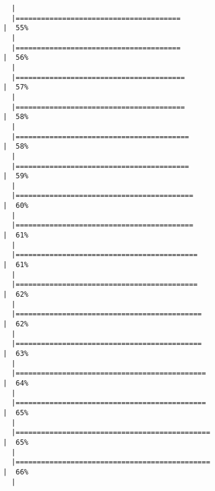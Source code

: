 \documentclass[
  letterpaper,
]{book}
\begin{document}
\begin{verbatim}
  |                                                                            
  |=======================================                               |  55%
  |                                                                            
  |=======================================                               |  56%
  |                                                                            
  |========================================                              |  57%
  |                                                                            
  |========================================                              |  58%
  |                                                                            
  |=========================================                             |  58%
  |                                                                            
  |=========================================                             |  59%
  |                                                                            
  |==========================================                            |  60%
  |                                                                            
  |==========================================                            |  61%
  |                                                                            
  |===========================================                           |  61%
  |                                                                            
  |===========================================                           |  62%
  |                                                                            
  |============================================                          |  62%
  |                                                                            
  |============================================                          |  63%
  |                                                                            
  |=============================================                         |  64%
  |                                                                            
  |=============================================                         |  65%
  |                                                                            
  |==============================================                        |  65%
  |                                                                            
  |==============================================                        |  66%
  |                                                                            

\end{verbatim}
\end{document}
